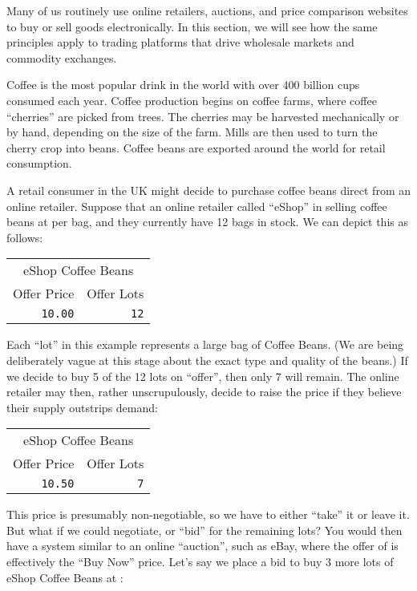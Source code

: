 \documentclass[11pt,a4paper]{article}
\newcommand{\s}{\textsterling}
\begin{document}
Many of us routinely use online retailers, auctions, and price comparison websites to buy or sell
goods electronically. In this section, we will see how the same principles apply to trading
platforms that drive wholesale \glspl{market} and commodity \glspl{exchange}.

Coffee is the most popular drink in the world with over 400 billion cups consumed each year. Coffee
production begins on coffee farms, where coffee ``cherries'' are picked from trees. The cherries may
be harvested mechanically or by hand, depending on the size of the farm. Mills are then used to turn
the cherry crop into beans. Coffee beans are exported around the world for retail consumption.

A retail consumer in the UK might decide to purchase coffee beans direct from an online
retailer. Suppose that an online retailer called ``eShop'' in selling coffee beans at \s10.00 per
bag, and they currently have 12 bags in stock. We can depict this as follows:

\vspace{5mm}
\begin{tabular}{rr}
\multicolumn{2}{c}{eShop Coffee Beans}\\
Offer Price&Offer Lots\\
\hline
\texttt{10.00}&\texttt{12}\\
\end{tabular}
\vspace{5mm}

Each ``\gls{lot}'' in this example represents a large bag of Coffee Beans. (We are being
deliberately vague at this stage about the exact type and quality of the beans.) If we decide to buy
5 of the 12 \glspl{lot} on ``\gls{offer}'', then only 7 will remain. The online retailer may then,
rather unscrupulously, decide to raise the price if they believe their supply outstrips demand:

\vspace{5mm}
\begin{tabular}{rr}
\multicolumn{2}{c}{eShop Coffee Beans}\\
Offer Price&Offer Lots\\
\hline
\texttt{10.50}&\texttt{7}\\
\end{tabular}
\vspace{5mm}

This price is presumably non-negotiable, so we have to either ``take'' it or leave it. But what if
we could negotiate, or ``\gls{bid}'' for the remaining \glspl{lot}? You would then have a system
similar to an online ``\gls{auction}'', such as eBay\cite{ebay}, where the \gls{offer} of \s10.50 is
effectively the ``Buy Now'' price. Let's say we place a \gls{bid} to buy 3 more \glspl{lot} of eShop
Coffee Beans at \s10.20:
\end{document}
